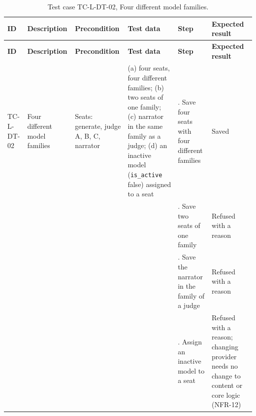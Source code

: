 {\footnotesize{}\renewcommand{\arraystretch}{1.1}
\begin{longtable}{|>{\raggedright\arraybackslash}p{}|>{\raggedright\arraybackslash}p{}|>{\raggedright\arraybackslash}p{}|>{\raggedright\arraybackslash}p{}|>{\raggedright\arraybackslash}p{}|>{\raggedright\arraybackslash}p{}|}
\caption{Test case TC-L-DT-02, Four different model families.} \\
\hline
\textbf{ID} & \textbf{Description} & \textbf{Precondition} & \textbf{Test data} & \textbf{Step} & \textbf{Expected result} \\ \hline
\endfirsthead
\hline
\textbf{ID} & \textbf{Description} & \textbf{Precondition} & \textbf{Test data} & \textbf{Step} & \textbf{Expected result} \\ \hline
\endhead
TC-L-DT-02 & Four different model families & Seats: generate, judge A, B, C, narrator & (a) four seats, four different families; (b) two seats of one family; (c) narrator in the same family as a judge; (d) an inactive model (\texttt{is\_\allowbreak{}active} false) assigned to a seat & 1. Save four seats with four different families & Saved \\ \cline{5-6}
 &  &  &  & 2. Save two seats of one family & Refused with a reason \\ \cline{5-6}
 &  &  &  & 3. Save the narrator in the family of a judge & Refused with a reason \\ \cline{5-6}
 &  &  &  & 4. Assign an inactive model to a seat & Refused with a reason; changing provider needs no change to content or core logic (NFR-12) \\ \hline
\end{longtable}
}

